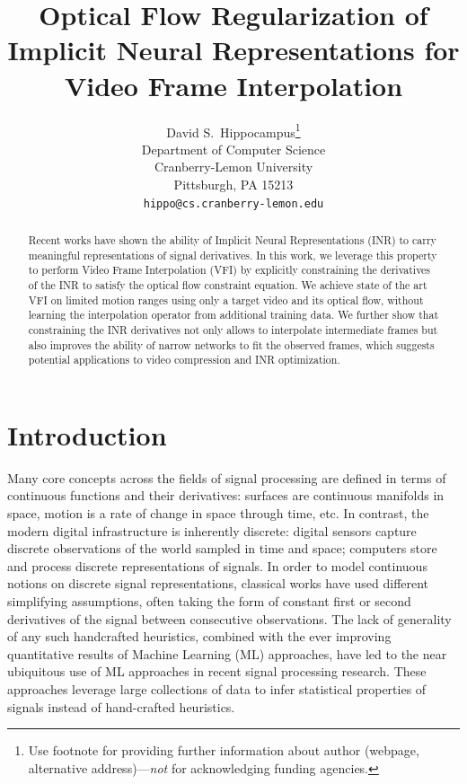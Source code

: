 \documentclass{article}
\title{Optical Flow Regularization of Implicit Neural Representations for Video Frame Interpolation}
\author{%
  David S.~Hippocampus\thanks{Use footnote for providing further information
    about author (webpage, alternative address)---\emph{not} for acknowledging
    funding agencies.} \\
  Department of Computer Science\\
  Cranberry-Lemon University\\
  Pittsburgh, PA 15213 \\
  \texttt{hippo@cs.cranberry-lemon.edu} \\
}
\begin{document}
\maketitle


\begin{abstract}
Recent works have shown the ability of Implicit Neural Representations (INR) to carry meaningful representations of signal derivatives.
In this work, we leverage this property to perform Video Frame Interpolation (VFI)
by explicitly constraining the derivatives of the INR to satisfy the optical flow constraint equation.
We achieve state of the art VFI on limited motion ranges
using only a target video and its optical flow, without learning the interpolation operator from additional training data.
We further show that constraining the INR derivatives not only
allows to interpolate intermediate frames but also improves the ability of narrow networks to fit the observed frames,
which suggests potential applications to video compression and INR optimization.
\end{abstract}

\section{Introduction}


Many core concepts across the fields of signal processing are defined in terms of continuous functions and their derivatives:
surfaces are continuous manifolds in space,
motion is a rate of change in space through time, etc.
In contrast, the modern digital infrastructure is inherently discrete:
digital sensors capture discrete observations of the world sampled in time and space;
computers store and process discrete representations of signals.
In order to model continuous notions on discrete signal representations,
classical works have used different simplifying assumptions,
often taking the form of constant first or second derivatives of the signal between consecutive observations.
The lack of generality of any such handcrafted heuristics,
combined with the ever improving quantitative results of Machine Learning (ML) approaches,
have led to the near ubiquitous use of ML approaches in recent signal processing research.
These approaches leverage large collections of data to infer statistical properties of signals instead of hand-crafted heuristics.
\end{document}
